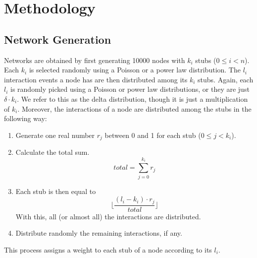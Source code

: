\section{Methodology}
\subsection{Network Generation}
Networks are obtained by first generating 10000 nodes with $k_i$ stubs ($0 \leq i < n$). Each $k_i$ is selected randomly using a Poisson or a power law distribution. The $l_i$ interaction events a node has are then distributed among its $k_i$ stubs. Again, each $l_i$ is randomly picked using a Poisson or power law distributions, or they are just $\delta \cdot k_i$. We refer to this as the delta distribution, though it is just a multiplication of $k_i$. Moreover, the interactions of a node are distributed among the stubs in the following way:
\begin{enumerate}
    \item Generate one real number $r_j$ between 0 and 1 for each stub ($0 \leq j < k_i$).
    \item Calculate the total sum. $$total = \sum_{j=0}^{k_i}r_j$$
    \item Each stub is then equal to $$\lfloor \frac{(l_i-k_i)\cdot r_j}{total}\rfloor$$
    With this, all (or almost all) the interactions are distributed.
    \item Distribute randomly the remaining interactions, if any.
\end{enumerate}
This process assigns a weight to each stub of a node according to its $l_i$.

